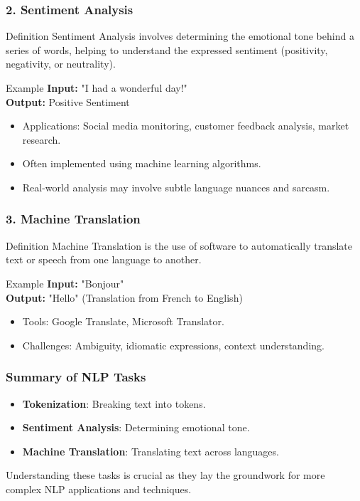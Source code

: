 \documentclass{beamer}
\begin{document}
\begin{frame}[fragile]
    \frametitle{2. Sentiment Analysis}
    \begin{block}{Definition}
        Sentiment Analysis involves determining the emotional tone behind a series of words,
        helping to understand the expressed sentiment (positivity, negativity, or neutrality).
    \end{block}
    
    \begin{exampleblock}{Example}
        \textbf{Input:} "I had a wonderful day!" \\
        \textbf{Output:} Positive Sentiment
    \end{exampleblock}
    
    \begin{itemize}
        \item Applications: Social media monitoring, customer feedback analysis, market research.
        \item Often implemented using machine learning algorithms.
        \item Real-world analysis may involve subtle language nuances and sarcasm.
    \end{itemize}
\end{frame}

\begin{frame}[fragile]
    \frametitle{3. Machine Translation}
    \begin{block}{Definition}
        Machine Translation is the use of software to automatically translate text or speech from one language to another.
    \end{block}
    
    \begin{exampleblock}{Example}
        \textbf{Input:} "Bonjour" \\
        \textbf{Output:} "Hello" (Translation from French to English)
    \end{exampleblock}
    
    \begin{itemize}
        \item Tools: Google Translate, Microsoft Translator.
        \item Challenges: Ambiguity, idiomatic expressions, context understanding.
    \end{itemize}
\end{frame}

\begin{frame}[fragile]
    \frametitle{Summary of NLP Tasks}
    \begin{itemize}
        \item \textbf{Tokenization}: Breaking text into tokens.
        \item \textbf{Sentiment Analysis}: Determining emotional tone.
        \item \textbf{Machine Translation}: Translating text across languages.
    \end{itemize}
    Understanding these tasks is crucial as they lay the groundwork for more complex NLP applications and techniques.
\end{frame}
\end{document}
